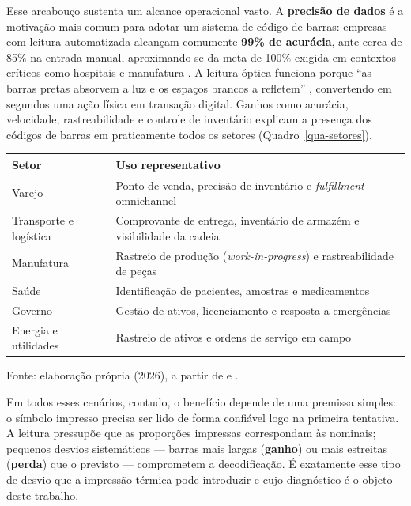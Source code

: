 \documentclass[
	article,			%
	11pt,				%
	oneside,			%
	a4paper,			%
	english,			%
	brazilian,			%
	sumario=tradicional
	]{abntex2}
\begin{document}
Esse arcabouço sustenta um alcance operacional vasto. A \textbf{precisão de dados} é
a motivação mais comum para adotar um sistema de código de barras: empresas com
leitura automatizada alcançam comumente \textbf{99\% de acurácia}, ante cerca de
85\% na entrada manual, aproximando-se da meta de 100\% exigida em contextos
críticos como hospitais e manufatura \cite{zebra_barcoding101}. A leitura óptica
funciona porque ``as barras pretas absorvem a luz e os espaços brancos a refletem''
\cite{gs1br}, convertendo em segundos uma ação física em transação digital. Ganhos
como acurácia, velocidade, rastreabilidade e controle de inventário explicam a
presença dos códigos de barras em praticamente todos os setores
(Quadro~\ref{qua-setores}).

\begin{quadro}[htb]
\centering
\caption{Setores e usos representativos da etiquetagem por código de barras}
\label{qua-setores}
\begin{tabular}{@{}p{3.6cm}p{8.4cm}@{}}
\toprule
\textbf{Setor} & \textbf{Uso representativo}\\
\midrule
Varejo & Ponto de venda, precisão de inventário e \textit{fulfillment} omnichannel\\
Transporte e logística & Comprovante de entrega, inventário de armazém e visibilidade da cadeia\\
Manufatura & Rastreio de produção (\textit{work-in-progress}) e rastreabilidade de peças\\
Saúde & Identificação de pacientes, amostras e medicamentos\\
Governo & Gestão de ativos, licenciamento e resposta a emergências\\
Energia e utilidades & Rastreio de ativos e ordens de serviço em campo\\
\bottomrule
\end{tabular}

\vspace{2pt}
{\footnotesize Fonte: elaboração própria (2026), a partir de  e .}
\end{quadro}

Em todos esses cenários, contudo, o benefício depende de uma premissa simples: o
símbolo impresso precisa ser lido de forma confiável logo na primeira tentativa. A
leitura pressupõe que as proporções impressas correspondam às nominais; pequenos
desvios sistemáticos --- barras mais largas (\textbf{ganho}) ou mais estreitas
(\textbf{perda}) que o previsto --- comprometem a decodificação. É exatamente esse
tipo de desvio que a impressão térmica pode introduzir e cujo diagnóstico é o objeto
deste trabalho.
\end{document}
